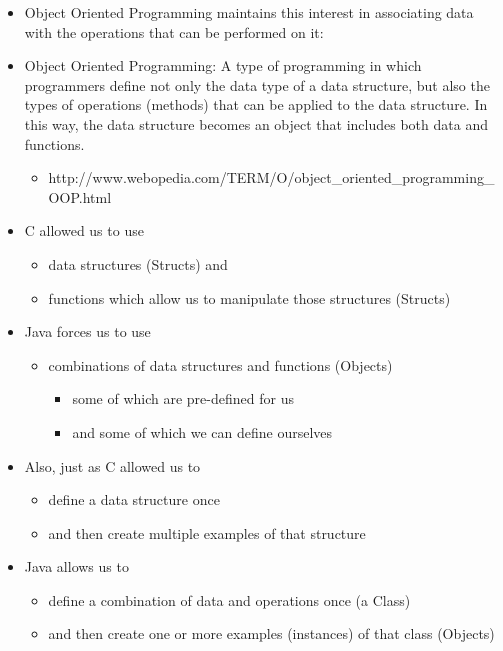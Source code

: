 \documentclass{beamer}
\begin{document}
\begin{frame}\begin{itemize}
\item Object Oriented Programming maintains this interest in associating
data with the operations that can be performed on it:
\item Object Oriented Programming: A type of programming in which programmers
define not only the data type of a data structure, but also the types
of operations (methods) that can be applied to the data structure.
In this way, the data structure becomes an object that includes both
data and functions.
\begin{itemize}
\tiny
\item http://www.webopedia.com/TERM/O/object\_oriented\_programming\_OOP.html
\normalsize
\end{itemize}
\end{itemize}\end{frame}\begin{frame}\begin{itemize}
\item C allowed us to use 
\begin{itemize}
\item data structures (Structs) and 
\item functions which allow us to manipulate those structures (Structs)
\end{itemize}
\item Java forces us to use 

\begin{itemize}
\item combinations of data structures and functions (\alert{Objects})

\begin{itemize}
\item some of which are pre-defined for us
\item and some of which we can define ourselves
\end{itemize}
\end{itemize}
\end{itemize}\end{frame}

\begin{frame}\begin{itemize}
\item Also, just as C allowed us to 

\begin{itemize}
\item define a data structure once 
\item and then create multiple examples of that structure
\end{itemize}
\item Java allows us to 
\begin{itemize}
\item define a combination of data and operations once (a \alert{Class})
\item and then create one or more examples (instances) of that class (\alert{Objects})
\end{itemize}
\end{itemize}\end{frame}
\end{document}
